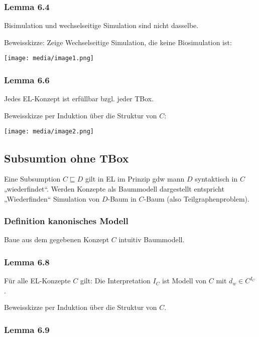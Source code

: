 \subsubsection{Lemma 6.4}\label{lemma-6.4}

Bisimulation und wechselseitige Simulation sind nicht dasselbe.

Beweisskizze: Zeige Wechselseitige Simulation, die keine Biosimulation
ist:

\texttt{[image: media/image1.png]}

\subsubsection{Lemma 6.6}\label{lemma-6.6}

Jedes EL-Konzept ist erfüllbar bzgl. jeder TBox.

Beweisskizze per Induktion über die Struktur von $C$:

\texttt{[image: media/image2.png]}

\subsection{Subsumtion ohne TBox}\label{subsumtion-ohne-tbox}

Eine Subsumption $C \sqsubseteq D$ gilt in EL im Prinzip gdw mann
$D$ syntaktisch in $C$ „wiederfindet``. Werden Konzepte als
Baummodell dargestellt entspricht „Wiederfinden`` Simulation von
$D$-Baum in $C$-Baum (also Teilgraphenproblem).

\subsubsection{Definition kanonisches
Modell}\label{definition-kanonisches-modell}

Baue aus dem gegebenen Konzept $C$ intuitiv Baummodell.

\hypertarget{lemma-6.8}{\subsubsection{Lemma 6.8}\label{lemma-6.8}}

Für alle EL-Konzepte $C$ gilt: Die Interpretation $I_{C}$ ist Modell
von $C$ mit $d_{w} \in C^{I_{C}}$.

Beweisskizze per Induktion über die Struktur von $C$.

\hypertarget{lemma-6.9}{\subsubsection{Lemma 6.9}\label{lemma-6.9}}

